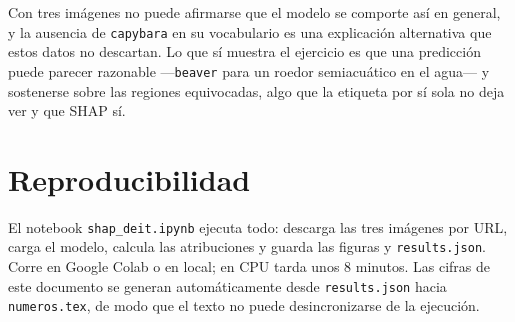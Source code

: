 \documentclass[11pt,a4paper]{article}
\begin{document}
Con tres imágenes no puede afirmarse que el modelo se comporte así en general, y la ausencia
de \texttt{capybara} en su vocabulario es una explicación alternativa que estos datos no
descartan. Lo que sí muestra el ejercicio es que una predicción puede parecer razonable
—\texttt{beaver} para un roedor semiacuático en el agua— y sostenerse sobre las regiones
equivocadas, algo que la etiqueta por sí sola no deja ver y que SHAP sí.

\section*{Reproducibilidad}

El notebook \texttt{shap\_deit.ipynb} ejecuta todo: descarga las tres imágenes por URL, carga
el modelo, calcula las atribuciones y guarda las figuras y \texttt{results.json}. Corre en
Google Colab o en local; en CPU tarda unos 8 minutos. Las cifras de este documento se generan
automáticamente desde \texttt{results.json} hacia \texttt{numeros.tex}, de modo que el texto
no puede desincronizarse de la ejecución.



\end{document}
